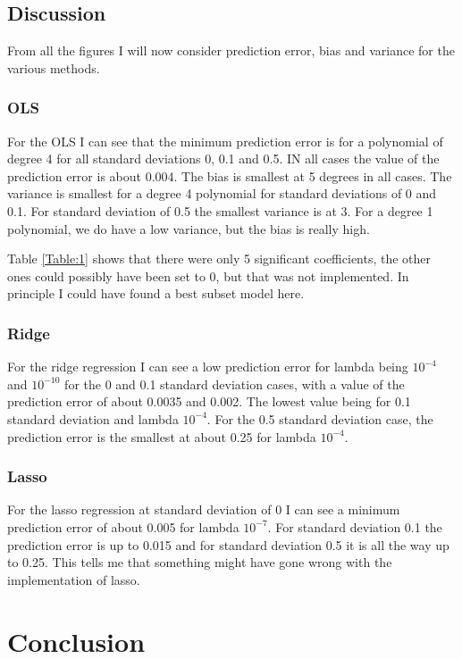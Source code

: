 \medskip

\subsection{Discussion}
From all the figures I will now consider prediction error, bias and variance for the various methods.

\subsubsection{OLS}
For the OLS I can see that the minimum prediction error is for a polynomial of degree 4 for all standard deviations 0, 0.1 and 0.5. IN all cases the value of the prediction error is about 0.004. The bias is smallest at 5 degrees in all cases. The variance is smallest for a degree 4 polynomial for standard deviations of 0 and 0.1. For standard deviation of 0.5 the smallest variance is at 3. For a degree 1 polynomial, we do have a low variance, but the bias is really high.
\medskip

Table \ref{Table:1} shows that there were only 5 significant coefficients, the other ones could possibly have been set to 0, but that was not implemented. In principle I could have found a best subset model here.

\subsubsection{Ridge}
For the ridge regression I can see a low prediction error for lambda being $10^{-4}$ and $10^{-10}$ for the 0 and 0.1 standard deviation cases, with a value of the prediction error of about 0.0035 and 0.002. The lowest value being for 0.1 standard deviation and lambda $10^{-4}$. For the 0.5 standard deviation case, the prediction error is the smallest at about 0.25 for lambda $10^{-4}$.

\subsubsection{Lasso}
For the lasso regression at standard deviation of 0 I can see a minimum prediction error of about 0.005 for lambda $10^{-7}$. For standard deviation 0.1 the prediction error is up to 0.015 and for standard deviation 0.5 it is all the way up to 0.25. This tells me that something might have gone wrong with the implementation of lasso. 

\section{Conclusion}

